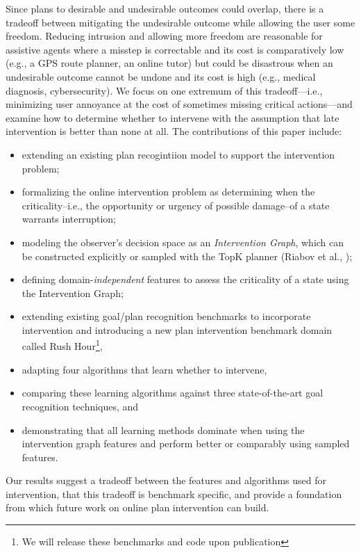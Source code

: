 \documentclass[letterpaper]{article}
\theoremstyle{plain}
\begin{document}
Since plans to desirable and undesirable outcomes could overlap, there is a tradeoff between mitigating the undesirable outcome while allowing the user some freedom.  
Reducing intrusion and allowing more freedom are reasonable for assistive agents where a misstep is correctable and its cost is comparatively low (e.g., a GPS route planner, an online tutor) but could be disastrous when an undesirable outcome cannot be undone and its cost is high (e.g., medical diagnosis, cybersecurity).  
We focus on one extremum of this tradeoff---i.e., minimizing user annoyance at the cost of sometimes missing critical actions---and examine how to determine whether to intervene with the assumption that late intervention is better than none at all.
The contributions of this paper include:
\begin{itemize}
\item extending an existing plan recogintiion model to support the intervention problem;
\item formalizing the online intervention problem as determining when the criticality--i.e., the opportunity or urgency of possible damage--of a state warrants interruption; 
\item modeling the observer's decision space as an \emph{Intervention Graph}, which can be constructed explicitly or sampled with the TopK planner (Riabov et al., \citeyear{riabov2014});
\item defining domain-\emph{independent} features to assess the criticality of a state using the Intervention Graph;
\item extending existing goal/plan recognition benchmarks \cite{ramirez2009plan,ramirez2010probabilistic} to incorporate intervention and introducing a new plan intervention benchmark domain called Rush Hour\footnote{We will release these benchmarks and code upon publication}, 
\item adapting four algorithms that learn whether to intervene, 
\item comparing these learning algorithms against three state-of-the-art goal recognition techniques, and
\item demonstrating that all learning methods dominate when using the intervention graph features and perform better or comparably using sampled features.
\end{itemize}
Our results suggest a tradeoff between the features and algorithms used for intervention, that this tradeoff is benchmark specific, and provide a foundation from which future work on online plan intervention can build.
\end{document}
